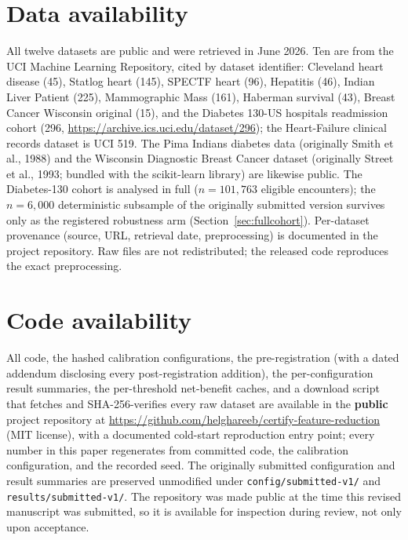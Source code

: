 \documentclass[fleqn,10pt]{wlscirep}
\newcommand{\result}[1]{#1}
\begin{document}
\section*{Data availability}
All twelve datasets are public and were retrieved in June 2026. Ten are from the UCI Machine Learning
Repository, cited by dataset identifier: Cleveland heart disease (45), Statlog heart (145), SPECTF
heart (96), Hepatitis (46), Indian Liver Patient (225), Mammographic Mass (161), Haberman survival
(43), Breast Cancer Wisconsin original (15), and the Diabetes 130-US hospitals readmission cohort
(296, \url{https://archive.ics.uci.edu/dataset/296}); the Heart-Failure clinical records dataset is
UCI 519. The Pima Indians diabetes data (originally Smith et al., 1988) and the Wisconsin Diagnostic
Breast Cancer dataset (originally Street et al., 1993; bundled with the scikit-learn library) are likewise public. The Diabetes-130 cohort is
analysed in full (\result{$n=101{,}763$} eligible encounters); the $n=6{,}000$ deterministic
subsample of the originally submitted version survives only as the registered robustness arm
(Section~\ref{sec:fullcohort}). Per-dataset
provenance (source, URL, retrieval date, preprocessing) is documented in the project repository. Raw files are not redistributed; the released code reproduces the exact
preprocessing.

\section*{Code availability}
All code, the hashed calibration configurations, the pre-registration (with a dated addendum
disclosing every post-registration addition), the per-configuration result summaries, the
per-threshold net-benefit caches, and a download script that fetches and SHA-256-verifies every raw
dataset are available in the \textbf{public} project repository at
\url{https://github.com/helghareeb/certify-feature-reduction} (MIT license), with a documented cold-start
reproduction entry point; every number in this paper regenerates from committed code, the
calibration configuration, and the recorded seed. The originally submitted configuration and result
summaries are preserved unmodified under \texttt{config/submitted-v1/} and
\texttt{results/submitted-v1/}. The repository was made public at the time this revised manuscript
was submitted, so it is available for inspection during review, not only upon acceptance.
\end{document}
